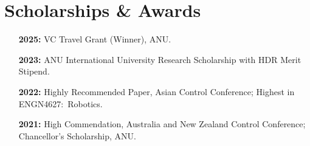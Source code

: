 \section{Scholarships \& Awards}
\begin{enumerate}[leftmargin=30pt,labelsep=0.6em,itemsep=0pt,topsep=0pt]
  \item[\textbf{2025:}] VC Travel Grant (Winner), ANU.
  \item[\textbf{2023:}] ANU International University Research Scholarship with HDR Merit Stipend.
  \item[\textbf{2022:}] Highly Recommended Paper, Asian Control Conference; Highest in ENGN4627:~Robotics.
  \item[\textbf{2021:}] High Commendation, Australia and New Zealand Control Conference; Chancellor's Scholarship, ANU.
\end{enumerate}


